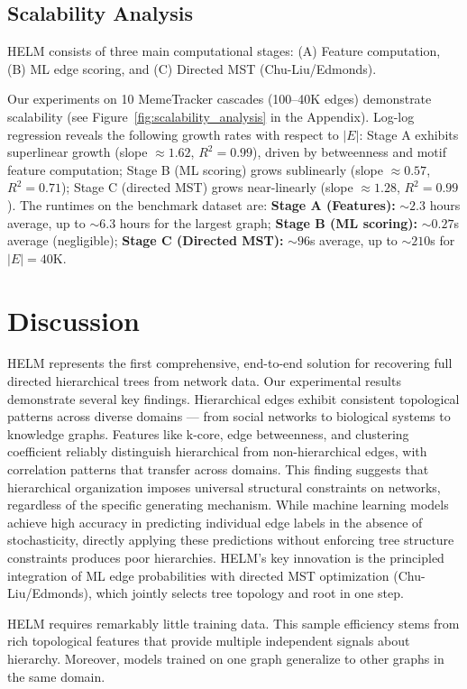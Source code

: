 \documentclass{article}
\begin{document}
    \subsection{Scalability Analysis}
    HELM consists of three main computational stages: (A) Feature computation, (B) ML edge scoring, and (C) Directed MST (Chu-Liu/Edmonds).

    Our experiments on 10 MemeTracker cascades (100--40K edges) demonstrate scalability (see Figure~\ref{fig:scalability_analysis} in the Appendix). Log-log regression reveals the following growth rates with respect to $|E|$: Stage A exhibits superlinear growth (slope $\approx 1.62$, $R^2=0.99$), driven by betweenness and motif feature computation; Stage B (ML scoring) grows sublinearly (slope $\approx 0.57$, $R^2=0.71$); Stage C (directed MST) grows near-linearly (slope $\approx 1.28$, $R^2=0.99$). The runtimes on the benchmark dataset are: \textbf{Stage A (Features):} $\sim 2.3$ hours average, up to $\sim 6.3$ hours for the largest graph; \textbf{Stage B (ML scoring):} $\sim 0.27$s average (negligible); \textbf{Stage C (Directed MST):} $\sim 96$s average, up to $\sim 210$s for $|E|{=}40$K.

    \section{Discussion}
    HELM represents the first comprehensive, end-to-end solution for recovering full directed hierarchical trees from network data. Our experimental results demonstrate several key findings. Hierarchical edges exhibit consistent topological patterns across diverse domains — from social networks to biological systems to knowledge graphs. Features like k-core, edge betweenness, and clustering coefficient reliably distinguish hierarchical from non-hierarchical edges, with correlation patterns that transfer across domains. This finding suggests that hierarchical organization imposes universal structural constraints on networks, regardless of the specific generating mechanism. While machine learning models achieve high accuracy in predicting individual edge labels in the absence of stochasticity, directly applying these predictions without enforcing tree structure constraints produces poor hierarchies. HELM's key innovation is the principled integration of ML edge probabilities with directed MST optimization (Chu-Liu/Edmonds), which jointly selects tree topology and root in one step.

    HELM requires remarkably little training data. This sample efficiency stems from rich topological features that provide multiple independent signals about hierarchy. Moreover, models trained on one graph generalize to other graphs in the same domain.
\end{document}
